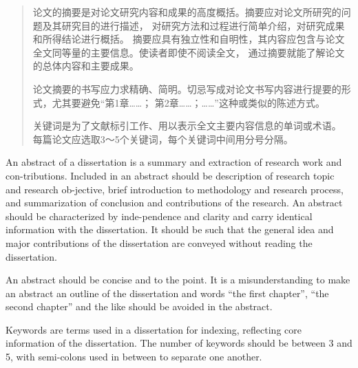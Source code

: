 \documentclass[degree=bachelor]{thuthesis}
\begin{document}
\START
\showoutput

\maketitle

\copyrightpage

\frontmatter

\begin{abstract}
  论文的摘要是对论文研究内容和成果的高度概括。摘要应对论文所研究的问题及其研究目的进行描述，
  对研究方法和过程进行简单介绍，对研究成果和所得结论进行概括。
  摘要应具有独立性和自明性，其内容应包含与论文全文同等量的主要信息。使读者即使不阅读全文，
  通过摘要就能了解论文的总体内容和主要成果。

  论文摘要的书写应力求精确、简明。切忌写成对论文书写内容进行提要的形式，尤其要避免“第1章……；
  第2章……；……”这种或类似的陈述方式。

  关键词是为了文献标引工作、用以表示全文主要内容信息的单词或术语。
  每篇论文应选取3～5个关键词，每个关键词中间用分号分隔。

\end{abstract}


\begin{abstract*}
  An abstract of a dissertation is a summary and extraction of research work and con-tributions.
  Included in an abstract should be description of research topic and research ob-jective, brief introduction to methodology and research process, and summarization of conclusion and contributions of the research.
  An abstract should be characterized by inde-pendence and clarity and carry identical information with the dissertation.
  It should be such that the general idea and major contributions of the dissertation are conveyed without reading the dissertation.

  An abstract should be concise and to the point.
  It is a misunderstanding to make an abstract an outline of the dissertation and words “the first chapter”, “the second chapter” and the like should be avoided in the abstract.

  Keywords are terms used in a dissertation for indexing, reflecting core information of the dissertation.
  The number of keywords should be between 3 and 5, with semi-colons used in between to separate one another.

\end{abstract*}
\end{document}
